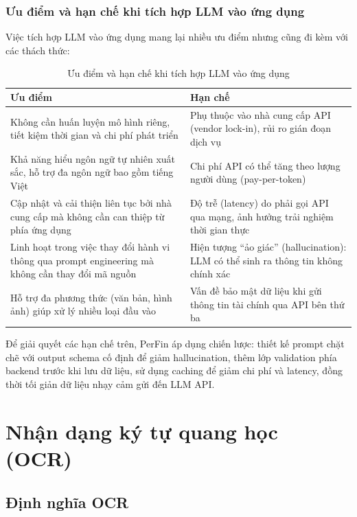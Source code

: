 \subsubsection{Ưu điểm và hạn chế khi tích hợp LLM vào ứng dụng}

Việc tích hợp LLM vào ứng dụng mang lại nhiều ưu điểm nhưng cũng đi kèm với các thách thức:

\begin{table}[h!]
\centering
\caption{Ưu điểm và hạn chế khi tích hợp LLM vào ứng dụng}
\label{tab:llm_pros_cons}
\begin{tabularx}{\textwidth}{|X|X|}
\hline
\textbf{Ưu điểm} & \textbf{Hạn chế} \\ \hline
Không cần huấn luyện mô hình riêng, tiết kiệm thời gian và chi phí phát triển & Phụ thuộc vào nhà cung cấp API (vendor lock-in), rủi ro gián đoạn dịch vụ \\ \hline
Khả năng hiểu ngôn ngữ tự nhiên xuất sắc, hỗ trợ đa ngôn ngữ bao gồm tiếng Việt & Chi phí API có thể tăng theo lượng người dùng (pay-per-token) \\ \hline
Cập nhật và cải thiện liên tục bởi nhà cung cấp mà không cần can thiệp từ phía ứng dụng & Độ trễ (latency) do phải gọi API qua mạng, ảnh hưởng trải nghiệm thời gian thực \\ \hline
Linh hoạt trong việc thay đổi hành vi thông qua prompt engineering mà không cần thay đổi mã nguồn & Hiện tượng ``ảo giác'' (hallucination): LLM có thể sinh ra thông tin không chính xác \\ \hline
Hỗ trợ đa phương thức (văn bản, hình ảnh) giúp xử lý nhiều loại đầu vào & Vấn đề bảo mật dữ liệu khi gửi thông tin tài chính qua API bên thứ ba \\ \hline
\end{tabularx}
\end{table}

Để giải quyết các hạn chế trên, PerFin áp dụng chiến lược: thiết kế prompt chặt chẽ với output schema cố định để giảm hallucination, thêm lớp validation phía backend trước khi lưu dữ liệu, sử dụng caching để giảm chi phí và latency, đồng thời tối giản dữ liệu nhạy cảm gửi đến LLM API.

\section{Nhận dạng ký tự quang học (OCR)}
\label{sec:ocr}

\subsection{Định nghĩa OCR}
\label{subsec:ocr_definition}

